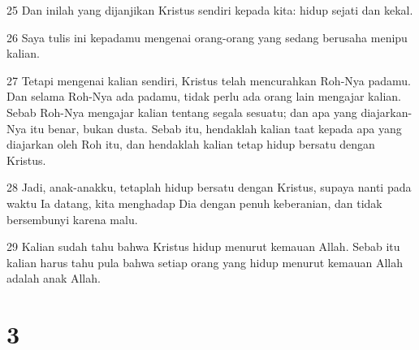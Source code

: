 \par 25 Dan inilah yang dijanjikan Kristus sendiri kepada kita: hidup sejati dan kekal.
\par 26 Saya tulis ini kepadamu mengenai orang-orang yang sedang berusaha menipu kalian.
\par 27 Tetapi mengenai kalian sendiri, Kristus telah mencurahkan Roh-Nya padamu. Dan selama Roh-Nya ada padamu, tidak perlu ada orang lain mengajar kalian. Sebab Roh-Nya mengajar kalian tentang segala sesuatu; dan apa yang diajarkan-Nya itu benar, bukan dusta. Sebab itu, hendaklah kalian taat kepada apa yang diajarkan oleh Roh itu, dan hendaklah kalian tetap hidup bersatu dengan Kristus.
\par 28 Jadi, anak-anakku, tetaplah hidup bersatu dengan Kristus, supaya nanti pada waktu Ia datang, kita menghadap Dia dengan penuh keberanian, dan tidak bersembunyi karena malu.
\par 29 Kalian sudah tahu bahwa Kristus hidup menurut kemauan Allah. Sebab itu kalian harus tahu pula bahwa setiap orang yang hidup menurut kemauan Allah adalah anak Allah.

\chapter{3}

